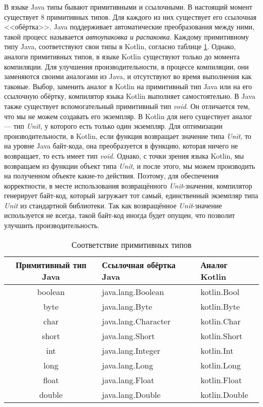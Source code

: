 В языке Java типы бывают примитивными и ссылочными. В настоящий момент существует 8 примитивных типов. Для каждого из них существует его ссылочная <<обёртка>>. Java поддерживает автоматические преобразования между ними, такой процесс называется \textit{автоупаковка и распаковка}. Каждому примитивному типу Java, соответствуют свои типы в Kotlin, согласно таблице \ref{tab:primitiveKotlinVsJava}. Однако, аналоги примитивных типов, в языке Kotlin существуют только до момента компиляции. Для улучшения производительности, в процессе компиляции, они заменяются своими аналогами из Java, и отсутствуют во время выполнения как таковые. Выбор, заменить аналог в Kotlin на примитивный тип Java или на его ссылочную обёртку, компилятор языка Kotlin выполняет самостоятельно.
В Java также существует вспомогательный примитивный тип \textit{void}. Он отличается тем, что мы не можем создавать его экземпляр. В Kotlin для него существует аналог --- тип \textit{Unit}, у которого есть только один экземпляр.
Для оптимизации производительности, в Kotlin, если функция возвращает значение типа \textit{Unit}, то на уровне Java байт-кода, она преобразуется в функцию, которая ничего не возвращает, то есть имеет тип \textit{void}. Однако, с точки зрения языка Kotlin, мы возвращаем из функции объект типа \textit{Unit}, и после этого, мы можем производить на полученном объекте какие-то действия. Поэтому, для обеспечения корректности, в месте использования возвращённого \textit{Unit}-значения, компилятор генерирует байт-код, который загружает тот самый, единственный экземпляр типа \textit{Unit} из стандартной библиотеки. Так как возвращённое \textit{Unit}-значение используется не всегда, такой байт-код иногда будет опущен, что позволит улучшить производительность.



\begin{table}[h]
\caption{\label{tab:primitiveKotlinVsJava}Соответствие примитивных типов}
\begin{center}
\begin{tabular}{|c|l|l|}
\hline
Примитивный тип Java & Ссылочная обёртка Java & Аналог Kotlin \\
\hline
boolean  & java.lang.Boolean  & kotlin.Bool  \\
byte  & java.lang.Byte & kotlin.Byte \\
char  & java.lang.Character & kotlin.Char \\
short  & java.lang.Short & kotlin.Short \\
int & java.lang.Integer & kotlin.Int \\
long &  java.lang.Long & kotlin.Long \\
float & java.lang.Float & kotlin.Float \\
double & java.lang.Double & kotlin.Double \\
\hline
\end{tabular}
\end{center}
\end{table}



